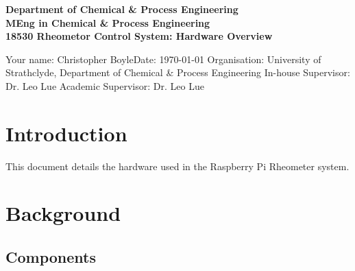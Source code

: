 \documentclass[a4]{report}
\def\atitle{Rheometor Control System: Hardware Overview}
\def\theauthor{Christopher Boyle}
\def\achapter{preamble}
\begin{document}
	\begin{titlepage}
		\centering
		\vskip4cm
		{
			\bfseries\Large
			Department of Chemical \& Process Engineering\\
			\vskip1cm
			MEng in Chemical \& Process Engineering\\
			18530
			\vskip3cm
			\LARGE\atitle
		}
		\vskip3cm
		\begin{flushleft}
			\vskip3cm
			Your name: \theauthor \hfill Date: \today
			\vskip1cm
			Organisation: University of Strathclyde, Department of Chemical \& Process Engineering\newline%
			In-house Supervisor: Dr. Leo Lue \newline%
			Academic Supervisor:  Dr. Leo Lue
		\end{flushleft}
	\end{titlepage}
	
	\def\achapter{Contents}
	\tableofcontents
	
	\setcounter{page}{1}
	
                                                               
	\chapter{Introduction}
	
	This document details the hardware used in the Raspberry Pi Rheometer system.
	
	\chapter{Background}
	
	\section{Components}
	
\end{document}
